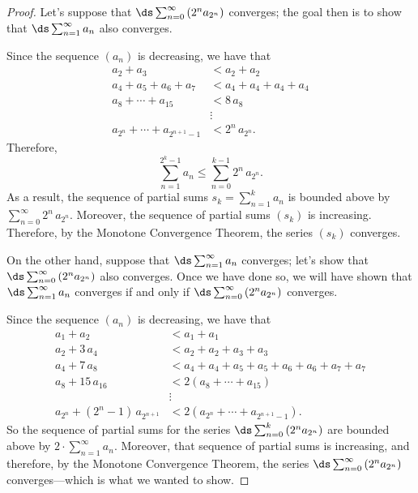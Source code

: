 \begin{proof}
  Let's suppose that $\ds\sum_{n=0}^\infty \left( 2^n a_{2^n} \right)$
  converges; the goal then is to show that $\ds\sum_{n=1}^\infty a_n$
  also converges.

  Since the sequence $(a_n)$ is decreasing, we have that
  \begin{align*}
  a_2 + a_3 &< a_2 + a_2 \\
  a_4 + a_5 + a_6 + a_7 &< a_4 + a_4 + a_4 + a_4 \\
  a_8 + \cdots + a_{15} &< 8 \, a_8 \\
  &\vdots \\
  a_{2^n} + \cdots + a_{2^{n+1} - 1} &< 2^n \, a_{2^n}.
  \end{align*}
  Therefore,
  $$
  \sum_{n=1}^{2^k - 1} a_n \leq \sum_{n=0}^{k-1} 2^n \, a_{2^n}.
  $$
  As a result, the sequence of partial sums $s_k = \sum_{n=1}^k a_n$ is bounded above by $\sum_{n=0}^\infty 2^n \, a_{2^n}$.  Moreover, the sequence of partial sums $(s_k)$ is increasing.  Therefore, by the Monotone Convergence Theorem, the series $(s_k)$ converges.

  On the other hand, suppose that $\ds\sum_{n=1}^\infty a_n$ converges; let's show that $\ds\sum_{n=0}^\infty \left( 2^n a_{2^n} \right)$
  also converges.  Once we have done so, we will have shown that  $\ds\sum_{n=1}^\infty a_n$ converges if and only if $\ds\sum_{n=0}^\infty \left( 2^n a_{2^n} \right)$ converges.

  Since the sequence $(a_n)$ is decreasing, we have that
  \begin{align*}
  a_1 + a_2 &< a_1 + a_1 \\
  a_2 + 3\,a_4 &< a_2 + a_2 + a_3 + a_3 \\
  a_4 + 7 \, a_8 &< a_4 + a_4 + a_5 + a_5 + a_6 + a_6 + a_7 + a_7 \\
  a_8 + 15 \, a_{16} &< 2(a_8 + \cdots + a_{15}) \\
  &\vdots \\
  a_{2^n} + (2^n - 1) \, a_{2^{n+1}} &< 2(a_{2^{n}} + \cdots + a_{2^{n+1} - 1}).
  \end{align*}
  So the sequence of partial sums for the series $\ds\sum_{n=0}^k \left( 2^n a_{2^n} \right)$ are bounded above by $2 \cdot \sum_{n=1}^\infty a_n$.  Moreover, that sequence of partial sums is increasing, and therefore, by the Monotone Convergence Theorem, the series $\ds\sum_{n=0}^\infty \left( 2^n a_{2^n} \right)$ converges---which is what we wanted to show.  
\end{proof}

